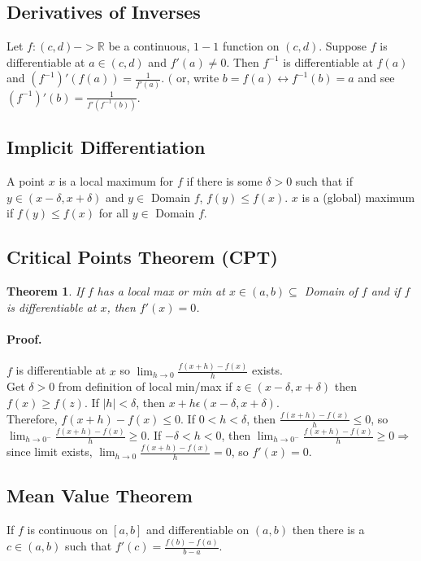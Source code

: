 \documentclass[11pt]{article}
\newcommand{\R}{{\mathbb R}}
\newtheorem {thm}{Theorem}
\begin{document}
\subsection{Derivatives of Inverses}
Let $f: (c, d) -> \R$ be a continuous, $1 - 1$ function on $(c, d)$. Suppose $f$ is differentiable at $a \in (c, d)$ and $f'(a) \neq 0$. Then $f^{-1}$ is differentiable at $f(a)$ and $(f^{-1})'(f(a)) = \frac{1}{f'(a)}$.
$($ or, write $b = f(a) \leftrightarrow f^{-1}(b) = a$ and see $(f^{-1})'(b) = \frac{1}{f'(f^{-1}(b))}$.

\subsection{Implicit Differentiation}
A point $x$ is a local maximum for $f$ if there is some $\delta > 0$ such that if $y \in (x - \delta, x + \delta)$ and $y \in$ Domain $f$, $f(y) \leq f(x)$. $x$ is a (global) maximum if $f(y) \leq f(x)$ for all $y \in$ Domain $f$.

\subsection{Critical Points Theorem (CPT)}
\begin{thm}
If $f$ has a local max or min at $x \in (a, b) \subseteq$ Domain of $f$ and if $f$ is differentiable at $x$, then $f'(x) = 0$.
\end{thm}

\paragraph{Proof.}
$f$ is differentiable at $x$ so $\lim_{h \to 0} \frac{f(x+h) - f(x)}{h}$ exists.\\
Get $\delta > 0$ from definition of local min/max if $z \in (x - \delta, x + \delta)$ then $f(x) \geq f(z)$. If $|h| < \delta$, then $x + h \epsilon (x - \delta, x + \delta)$.\\
Therefore, $f(x+h) - f(x) \leq 0$. If $0 < h < \delta$, then $\frac{f(x+h) - f(x)}{h} \leq 0$, so $\lim_{h \to 0^-} \frac{f(x+h) - f(x)}{h} \geq 0$. If $-\delta < h < 0$, then $\lim_{h \to 0^-} \frac{f(x+h) - f(x)}{h} \geq 0 \Rightarrow$ since limit exists, $\lim_{h \to 0} \frac{f(x+h) - f(x)}{h} = 0$, so $f'(x) = 0$.

\subsection{Mean Value Theorem}
If $f$ is continuous on $[a, b]$ and differentiable on $(a, b)$ then there is a $c \in (a, b)$ such that $f'(c) = \frac{f(b) - f(a)}{b - a}$.
\end{document}

